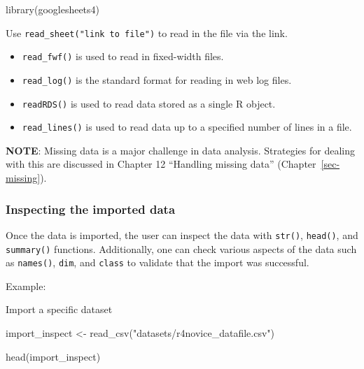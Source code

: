 \documentclass[
  letterpaper,
  DIV=11,
  numbers=noendperiod]{scrreprt}
\newenvironment{Shaded}{}{}
\newcommand{\FunctionTok}[1]{\textcolor[rgb]{0.44,0.26,0.76}{#1}}
\newcommand{\NormalTok}[1]{\textcolor[rgb]{0.14,0.16,0.18}{#1}}
\newcommand{\OtherTok}[1]{\textcolor[rgb]{0.44,0.26,0.76}{#1}}
\newcommand{\StringTok}[1]{\textcolor[rgb]{0.01,0.18,0.38}{#1}}
\begin{document}
\begin{Shaded}
\begin{Highlighting}[]
\FunctionTok{library}\NormalTok{(googlesheets4)}
\end{Highlighting}
\end{Shaded}

Use \texttt{read\_sheet("link\ to\ file")} to read in the file via the
link.

\begin{itemize}
\item
  \texttt{read\_fwf()} is used to read in fixed-width files.
\item
  \texttt{read\_log()} is the standard format for reading in web log
  files.
\item
  \texttt{readRDS()} is used to read data stored as a single R object.
\item
  \texttt{read\_lines()} is used to read data up to a specified number
  of lines in a file.
\end{itemize}

\textbf{NOTE}: Missing data is a major challenge in data analysis.
Strategies for dealing with this are discussed in Chapter 12 ``Handling
missing data'' (Chapter~\ref{sec-missing}).

\subsubsection{Inspecting the imported
data}\label{inspecting-the-imported-data}

Once the data is imported, the user can inspect the data with
\texttt{str()}, \texttt{head()}, and \texttt{summary()} functions.
Additionally, one can check various aspects of the data such as
\texttt{names()}, \texttt{dim}, and \texttt{class} to validate that the
import was successful.

Example:

Import a specific dataset

\begin{Shaded}
\begin{Highlighting}[]
\NormalTok{import\_inspect }\OtherTok{\textless{}{-}} \FunctionTok{read\_csv}\NormalTok{(}\StringTok{"datasets/r4novice\_datafile.csv"}\NormalTok{)}
\end{Highlighting}
\end{Shaded}

\begin{Shaded}
\begin{Highlighting}[]
\FunctionTok{head}\NormalTok{(import\_inspect)}
\end{Highlighting}
\end{Shaded}
\end{document}
